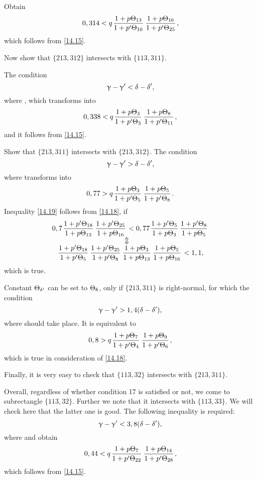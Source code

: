 Obtain
\begin{equation*}
	0,314 < q \up{13}{10} \up{16}{25},
\end{equation*}
which follows from \ref{14.15}.

Now show that $\{213, 312\}$ intersects with $\{113, 311\}$.

The condition
\begin{equation*}
	\upgamma - \upgamma' < \delta - \delta',
\end{equation*}
where
,
which transforms into
\begin{equation*}
	0,338 < q \up{3}{3} \up{8}{11},
\end{equation*}
and it follows from \ref{14.15}.

Show that $\{213, 311\}$ intersects with $\{213, 312\}$.
The condition
\begin{equation*}
	\upgamma - \upgamma' > \delta - \delta',
\end{equation*}
where
transforms into
\begin{equation}\label{14.19}
	0,77 > q \up{3}{5} \up{5}{8}.
\end{equation}
Inequality \ref{14.19} follows from \ref{14.18}, if
\begin{gather*}
	0,7 \pu{18}{13} \pu{25}{16} < 0,77 \pu{5}{3} \pu{8}{5}\\
	\ArrowBetweenLines
	\pp{18}{5} \pp{25}{8} \uu{3}{13} \uu{5}{16} < 1,1,
\end{gather*}
which is true.

Constant $\Theta_{\delta'}$ can be set to $\Theta_{8}$, only if $\{213, 311\}$ is right-normal, for which the condition
\begin{equation*}
	\upgamma - \upgamma' > 1,4 (\delta - \delta'),
\end{equation*}
where
should take place.
It is equivalent to
\begin{equation*}
	0,8 > q \up{7}{4} \up{9}{6},
\end{equation*}
which is true in consideration of \ref{14.18}.

Finally, it is very easy to check that $\{113, 32\}$ intersects with $\{213, 311\}$.

Overall, regardless of whether condition 17 is satisfied or not, we come to subrectangle $\{113, 32\}$.
Further we note that it intersects with $\{113, 33\}$.
We will check here that the latter one is good.
The following inequality is required:
\begin{equation*}
	\upgamma - \upgamma' < 3,8 (\delta - \delta'),
\end{equation*}
where
and obtain
\begin{equation*}
	0,44 < q \up{7}{22} \up{14}{28},
\end{equation*}
which follows from \ref{14.15}.

